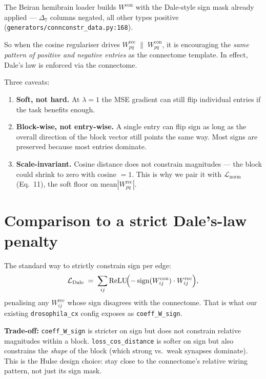 \documentclass[11pt]{article}
\begin{document}
The Beiran hemibrain loader builds $W^{\mathrm{con}}$ with the
Dale-style sign mask already applied --- $\Delta_7$ columns negated,
all other types positive (\texttt{generators/connconstr\_data.py:168}).

So when the cosine regulariser drives
$W^{\mathrm{rec}}_{pq}\;\parallel\;W^{\mathrm{con}}_{pq}$, it is
encouraging the \emph{same pattern of positive and negative entries} as
the connectome template. In effect, Dale's law is enforced via the
connectome.

Three caveats:

\begin{enumerate}[leftmargin=*]
\item \textbf{Soft, not hard.} At $\lambda=1$ the MSE gradient can still
      flip individual entries if the task benefits enough.
\item \textbf{Block-wise, not entry-wise.} A single entry can flip sign
      as long as the overall direction of the block vector still points
      the same way. Most signs are preserved because most entries
      dominate.
\item \textbf{Scale-invariant.} Cosine distance does not constrain
      magnitudes --- the block could shrink to zero with cosine $=1$.
      This is why we pair it with $\mathcal{L}_{\mathrm{norm}}$
      (Eq.~11), the soft floor on mean$|W^{\mathrm{rec}}_{pq}|$.
\end{enumerate}

\section{Comparison to a strict Dale's-law penalty}

The standard way to strictly constrain sign per edge:
\begin{equation}
\mathcal{L}_{\mathrm{Dale}}
\;=\; \sum_{ij}
   \operatorname{ReLU}\!\Bigl(
       -\operatorname{sign}(W^{\mathrm{con}}_{ij})\cdot W^{\mathrm{rec}}_{ij}
   \Bigr) ,
\end{equation}
penalising any $W^{\mathrm{rec}}_{ij}$ whose sign disagrees with the
connectome. That is what our existing \texttt{drosophila\_cx} config
exposes as \texttt{coeff\_W\_sign}.

\textbf{Trade-off:} \texttt{coeff\_W\_sign} is stricter on sign but does
not constrain relative magnitudes within a block.
\texttt{loss\_cos\_distance} is softer on sign but also constrains the
\emph{shape} of the block (which strong vs.\ weak synapses dominate).
This is the Hulse design choice: stay close to the connectome's
relative wiring pattern, not just its sign mask.
\end{document}
